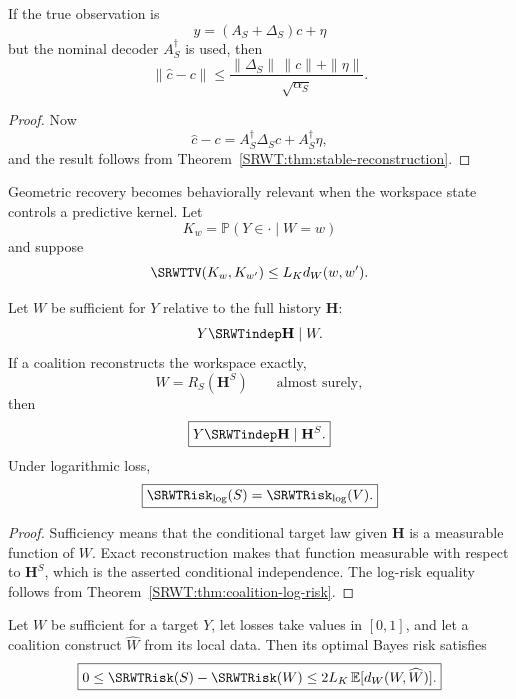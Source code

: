\begin{SRWTcorollary}\label{SRWT:cor:encoding-mismatch}
If the true observation is
\[
y=(A_S+\Delta_S)c+\eta
\]
but the nominal decoder \(A_S^\dagger\) is used, then
\[
\boxed{
\|\widehat c-c\|
\leq
\frac{\|\Delta_S\|\,\|c\|+\|\eta\|}{\sqrt{\alpha_S}}.
}
\]
\end{SRWTcorollary}

\begin{proof}
Now
\[
\widehat c-c=A_S^\dagger\Delta_Sc+A_S^\dagger\eta,
\]
and the result follows from Theorem~\ref{SRWT:thm:stable-reconstruction}.
\end{proof}


Geometric recovery becomes behaviorally relevant when the workspace state
controls a predictive kernel. Let
\[
K_w=\mathbb P(Y\in\cdot\mid W=w)
\]
and suppose
\[
\SRWTTV(K_w,K_{w'})\leq L_Kd_W(w,w').
\]

\begin{SRWTproposition}
\label{SRWT:prop:exact-reconstruction-sufficiency}
Let \(W\) be sufficient for \(Y\) relative to the full history \(\mathbf H\):
\[
Y\SRWTindep\mathbf H\mid W.
\]
If a coalition reconstructs the workspace exactly,
\[
W=R_S(\mathbf H^S)
\qquad\text{almost surely},
\]
then
\[
\boxed{
Y\SRWTindep\mathbf H\mid\mathbf H^S.
}
\]
Under logarithmic loss,
\[
\boxed{
\SRWTRisk_{\log}(S)=\SRWTRisk_{\log}(V).
}
\]
\end{SRWTproposition}

\begin{proof}
Sufficiency means that the conditional target law given \(\mathbf H\) is a
measurable function of \(W\). Exact reconstruction makes that function
measurable with respect to \(\mathbf H^S\), which is the asserted conditional
independence. The log-risk equality follows from
Theorem~\ref{SRWT:thm:coalition-log-risk}.
\end{proof}

\begin{SRWTproposition}\label{SRWT:prop:reconstruction-risk-transfer}
Let \(W\) be sufficient for a target \(Y\), let losses take values in
\([0,1]\), and let a coalition construct \(\widehat W\) from its local data.
Then its optimal Bayes risk satisfies
\[
\boxed{
0\leq
\SRWTRisk(S)-\SRWTRisk(W)
\leq
2L_K\,\mathbb E[d_W(W,\widehat W)].
}
\]
\end{SRWTproposition}

